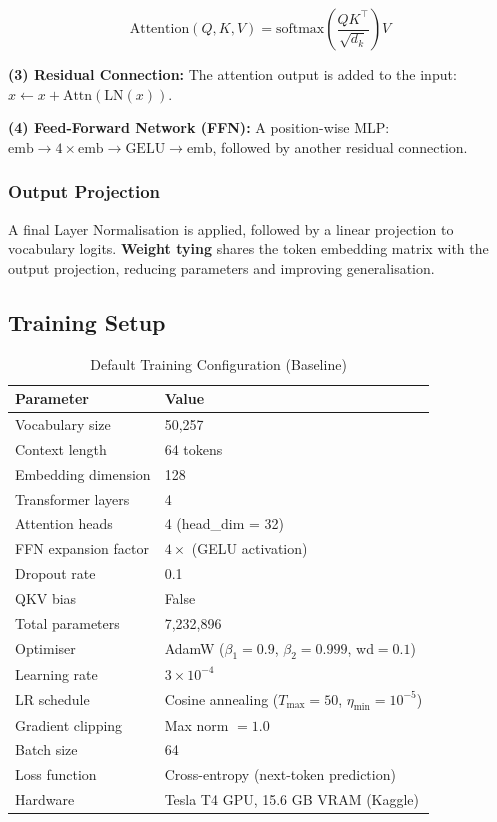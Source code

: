 \documentclass[12pt,a4paper]{article}
\begin{document}
$$\text{Attention}(Q,K,V) = \text{softmax}\!\left(\frac{QK^\top}{\sqrt{d_k}}\right)V$$

\textbf{(3) Residual Connection:} The attention output is added to the input: $x \leftarrow x + \text{Attn}(\text{LN}(x))$.

\textbf{(4) Feed-Forward Network (FFN):} A position-wise MLP: $\text{emb} \rightarrow 4\times\text{emb} \rightarrow \text{GELU} \rightarrow \text{emb}$, followed by another residual connection.

\subsubsection{Output Projection}
A final Layer Normalisation is applied, followed by a linear projection to vocabulary logits. \textbf{Weight tying} shares the token embedding matrix with the output projection, reducing parameters and improving generalisation.

\subsection{Training Setup}

\begin{table}[H]
\centering
\caption{Default Training Configuration (Baseline)}
\renewcommand{\arraystretch}{1.3}
\begin{tabular}{ll}
  \toprule
  \textbf{Parameter} & \textbf{Value} \\
  \midrule
  Vocabulary size       & 50,257 \\
  Context length        & 64 tokens \\
  Embedding dimension   & 128 \\
  Transformer layers    & 4 \\
  Attention heads       & 4 (head\_dim = 32) \\
  FFN expansion factor  & $4\times$ (GELU activation) \\
  Dropout rate          & 0.1 \\
  QKV bias              & False \\
  Total parameters      & 7,232,896 \\
  Optimiser             & AdamW ($\beta_1=0.9$, $\beta_2=0.999$, wd$=0.1$) \\
  Learning rate         & $3\times10^{-4}$ \\
  LR schedule           & Cosine annealing ($T_{\max}=50$, $\eta_{\min}=10^{-5}$) \\
  Gradient clipping     & Max norm $= 1.0$ \\
  Batch size            & 64 \\
  Loss function         & Cross-entropy (next-token prediction) \\
  Hardware              & Tesla T4 GPU, 15.6 GB VRAM (Kaggle) \\
  \bottomrule
\end{tabular}
\end{table}
\end{document}
